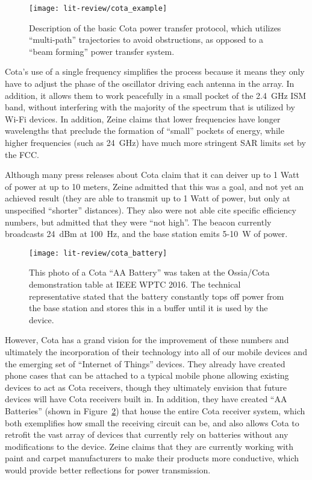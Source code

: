 \begin{figure}
\centering
\texttt{[image: lit-review/cota\_example]}
    \caption[Cota Process]{Description of the basic Cota power transfer protocol, which utilizes ``multi-path'' trajectories to avoid obstructions, as opposed to a ``beam forming'' power transfer system.}
    \label{fig:lit-review-cota-example}
\end{figure}

Cota's use of a single frequency simplifies the process because it means they only have to adjust the phase of the oscillator driving each antenna in the array. In addition, it allows them to work peacefully in a small pocket of the 2.4~GHz ISM band, without interfering with the majority of the spectrum that is utilized by Wi-Fi devices. In addition, Zeine claims that lower frequencies have longer wavelengths that preclude the formation of ``small'' pockets of energy, while higher frequencies (such as 24~GHz) have much more stringent SAR limits set by the FCC.

Although many press releases about Cota claim that it can deiver up to 1 Watt of power at up to 10 meters, Zeine admitted that this was a goal, and not yet an achieved result (they are able to transmit up to 1 Watt of power, but only at unspecified ``shorter'' distances). They also were not able cite specific efficiency numbers, but admitted that they were ``not high''. The beacon currently broadcasts 24~dBm at 100~Hz, and the base station emits 5-10~W of power.

\begin{figure}
\centering
\texttt{[image: lit-review/cota\_battery]}
    \caption[Cota Battery]{This photo of a Cota ``AA Battery'' was taken at the Ossia/Cota demonstration table at IEEE WPTC 2016. The technical representative stated that the battery constantly tops off power from the base station and stores this in a buffer until it is used by the device.}
    \label{fig:lit-review-cota-battery}
\end{figure}

However, Cota has a grand vision for the improvement of these numbers and ultimately the incorporation of their technology into all of our mobile devices and the emerging set of ``Internet of Things'' devices. They already have created phone cases that can be attached to a typical mobile phone allowing existing devices to act as Cota receivers, though they ultimately envision that future devices will have Cota receivers built in. In addition, they have created ``AA Batteries'' (shown in Figure~\ref{fig:lit-review-cota-battery}) that house the entire Cota receiver system, which both exemplifies how small the receiving circuit can be, and also allows Cota to retrofit the vast array of devices that currently rely on batteries without any modifications to the device. Zeine claims that they are currently working with paint and carpet manufacturers to make their products more conductive, which would provide better reflections for power transmission.


